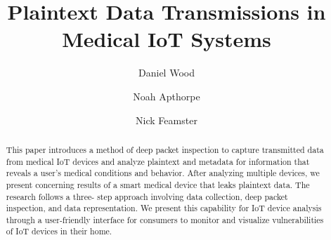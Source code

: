 \documentclass[sigconf]{acmart}
\begin{document}
\title{Plaintext Data Transmissions in Medical IoT Systems} %
\author{Daniel Wood}
\author{Noah Apthorpe}
\author{Nick Feamster}

\renewcommand{\shortauthors}{D. Wood et al.}


\begin{abstract} 
This paper introduces a method of deep packet inspection to
capture transmitted data from medical IoT devices and analyze plaintext and
metadata for information that reveals a user's medical conditions and
behavior. After analyzing multiple devices, we present concerning results of a
smart medical device that leaks plaintext data. The research follows a three-
step approach involving data collection, deep packet inspection, and data
representation. We present this capability for IoT device analysis
through a
user-friendly interface for consumers to monitor and visualize vulnerabilities
of IoT devices in their home.  
\end{abstract}


\maketitle



\balance
\end{document}
